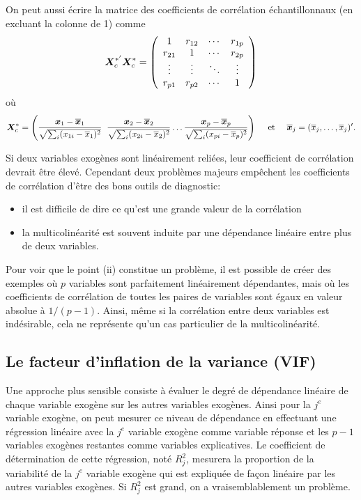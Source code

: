 On peut aussi écrire la matrice des coefficients de corrélation échantillonnaux (en excluant la colonne de 1) comme
\begin{eqnarray*}
\bm{X}_c^{*'}\bm{X}_c^{*}=\left(\begin{array}{cccc}
1 & r_{12} &  \cdots & r_{1p} \\
r_{21} & 1 & \cdots & r_{2p} \\
\vdots & \vdots & \ddots  & \vdots \\
r_{p1} & r_{p2} & \cdots  & 1
\end{array}
\right)
\end{eqnarray*}
où $$\bm{X}_c^*=\left(\frac{{\bm{x}}_1-\overline{{\bm{x}}}_1}{\sqrt{\sum_i (x_{1i}-\overline x_1)^2} }\;\;\frac{{\bm{x}}_2-\overline{{\bm{x}}}_2}{\sqrt{\sum_i (x_{2i}-\overline x_2)^2}} \ldots \frac{{\bm{x}}_p-\overline{{\bm{x}}}_p}{\sqrt{\sum_i (x_{pi}-\overline x_p)^2}}  \right)\quad \text{ et } \quad \overline{{\bm{x}}}_j=(\overline x_j,\ldots,\overline x_j)'.$$



Si deux variables exogènes sont linéairement reliées, leur coefficient de corrélation devrait
être élevé. Cependant deux problèmes majeurs empêchent les coefficients de corrélation
d'être des bons outils de diagnostic:
\begin{itemize}
\item[(i)] il est difficile de dire ce qu'est une grande valeur de la corrélation
\item[(ii)] la multicolinéarité est souvent induite par une dépendance linéaire entre plus de deux variables.
\end{itemize}
Pour voir que le point (ii) constitue un
problème, il est possible de créer des exemples où $p$ variables sont parfaitement linéairement
dépendantes, mais où les coefficients de corrélation de toutes les paires de variables sont
égaux en valeur absolue à $1/(p-1)$. Ainsi, même si la corrélation entre deux variables est indésirable, cela
ne représente qu'un cas particulier de la multicolinéarité.

\subsection{Le facteur d'inflation de la variance (VIF)}
\label{sec:vif}
Une approche plus sensible consiste à évaluer le degré de dépendance linéaire de chaque
variable exogène sur les autres variables exogènes. Ainsi pour la $j^e$ variable exogène,
on peut mesurer ce niveau de dépendance en effectuant une régression linéaire avec la $j^e$
variable exogène comme variable réponse et les $p-1$ variables exogènes restantes comme variables explicatives. Le coefficient de détermination de cette régression, noté $R^2_j$, mesurera la proportion de la variabilité de la $j^e$ variable exogène qui est expliquée de fa\c{c}on linéaire par les autres variables exogènes. Si $R_j^2$ est grand, on a vraisemblablement un problème.

